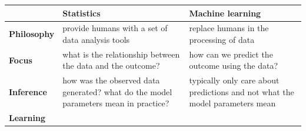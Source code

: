 \documentclass[]{book}
\begin{document}
\begin{longtable}[]{@{}lll@{}}
\toprule
\begin{minipage}[b]{0.10\columnwidth}\raggedright
\strut
\end{minipage} & \begin{minipage}[b]{0.41\columnwidth}\raggedright
Statistics\strut
\end{minipage} & \begin{minipage}[b]{0.41\columnwidth}\raggedright
Machine learning\strut
\end{minipage}\tabularnewline
\midrule
\endhead
\begin{minipage}[t]{0.10\columnwidth}\raggedright
\textbf{Philosophy}\strut
\end{minipage} & \begin{minipage}[t]{0.41\columnwidth}\raggedright
provide humans with a set of data analysis tools\strut
\end{minipage} & \begin{minipage}[t]{0.41\columnwidth}\raggedright
replace humans in the processing of data\strut
\end{minipage}\tabularnewline
\begin{minipage}[t]{0.10\columnwidth}\raggedright
\textbf{Focus}\strut
\end{minipage} & \begin{minipage}[t]{0.41\columnwidth}\raggedright
what is the relationship between the data and the outcome?\strut
\end{minipage} & \begin{minipage}[t]{0.41\columnwidth}\raggedright
how can we predict the outcome using the data?\strut
\end{minipage}\tabularnewline
\begin{minipage}[t]{0.10\columnwidth}\raggedright
\textbf{Inference}\strut
\end{minipage} & \begin{minipage}[t]{0.41\columnwidth}\raggedright
how was the observed data generated? what do the model parameters mean in practice?\strut
\end{minipage} & \begin{minipage}[t]{0.41\columnwidth}\raggedright
typically only care about predictions and not what the model parameters mean\strut
\end{minipage}\tabularnewline
\begin{minipage}[t]{0.10\columnwidth}\raggedright
\textbf{Learning}\strut
\end{minipage} & \begin{minipage}[t]{0.41\columnwidth}\raggedright

\end{minipage}
\end{longtable}
\end{document}
